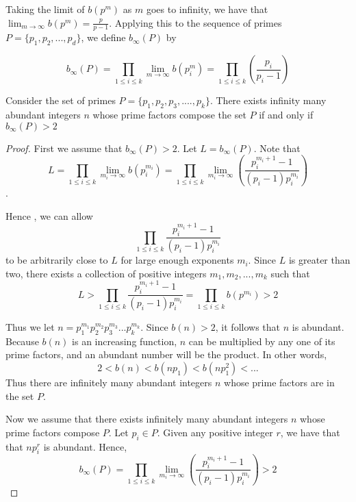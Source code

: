 \documentclass[../paper.tex]{article}
\begin{document}
Taking the limit of $b(p^m)$ as $m$ goes to infinity, we have that
$\lim_{m \rightarrow \infty}b(p^m) = \frac{p}{p-1}$.
Applying this to the sequence of primes $P = \{p_1, p_2, ..., p_d\}$,
we define $b_{\infty}(P)$ by

\begin{equation}\label{b_inf_def}
  b_{\infty}(P) 
  = \prod_{1 \leq i \leq k} \lim_{m \rightarrow \infty}b(p_i^m)
                = \prod_{1 \leq i \leq k}(\frac{p_i}{p_i - 1})
\end{equation}

\begin{theorem}\label{b_inf_1}
Consider the set of primes 
%
$P = \{p_{1}, p_{2}, p_{3}, .... , p_{k}\}$.
%
There exists infinity many abundant integers $n$ whose prime 
factors compose the set $P$  if and only if $b_{\infty}(P) > 2$

\end{theorem}

\begin{proof}

First we assume that $b_{\infty}(P) > 2$. Let $L = b_\infty(P)$. 
Note that
%  
$$L 
%
= \prod_{1 \leq i \leq k} \lim_{m_i \rightarrow \infty}b(p_i^{m_i}) 
%
= \prod_{1 \leq i \leq k} \lim_{m_i \rightarrow \infty} 
%
( \frac{p_i^{m_{i} + 1} -1}{(p_i -1)p_{i}^{m_{i}}})$$.

Hence , we can allow
$$\prod_{1 \leq i \leq k} \frac{p_i^{m_{i} + 1} -1}
{(p_i -1)p_{i}^{m_{i}}}$$ 
to be arbitrarily close to $L$ for large 
enough exponents $m_i$. Since $L$ is greater than two, there exists a
collection of positive integers $m_1, m_2, ... , m_k$ such that 
% 
$$L > \prod_{1 \leq i \leq k} \frac{p_i^{m_{i} + 1} -1}
{(p_i -1)p_{i}^{m_{i}}} = \prod_{1 \leq i \leq k} b(p^{m_i}) > 2$$
%

Thus we let $n=p_1^{m_1}p_2^{m_2}p_3^{m_3}...p_{k}^{m_k}$. 
Since $b(n) > 2$, it follows that $n$ is abundant. 
Because $b(n)$ is an increasing function, $n$ can be multiplied
by any one of its prime factors, and an abundant number 
will be the product. In other words,
%
$$2 < b(n) < b(np_1) < b(np_1^2) < ...$$
%
Thus there are infinitely many abundant integers $n$ whose prime
factors are in the set $P$.

Now we assume that there exists infinitely many abundant integers 
$n$ whose prime factors compose $P$. Let $p_i \in P$. Given any
positive integer $r$, we have that that $np_i^r$ is abundant. 
Hence,
%
$$ b_\infty(P) = \prod_{1 \leq i \leq k} \lim_{m_i \rightarrow 
\infty} ( \frac{p_i^{m_{i} + 1} -1}{(p_i -1)p_{i}^{m_{i}}}) > 2$$

\end{proof}
\end{document}
